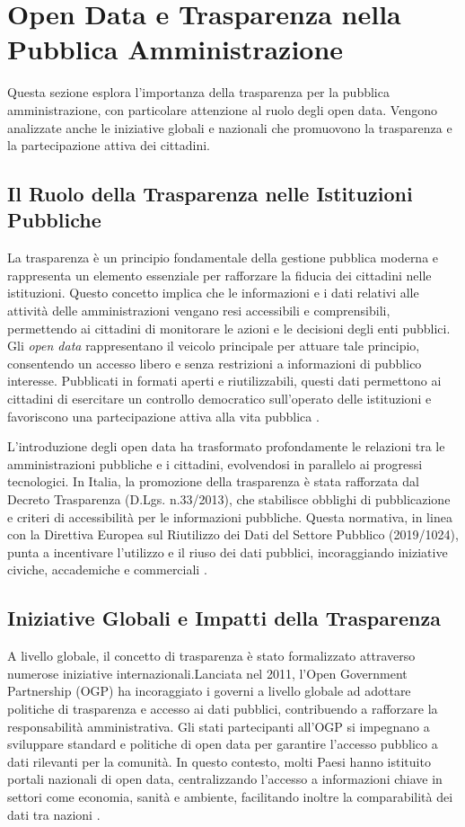 \section{Open Data e Trasparenza nella Pubblica Amministrazione}
Questa sezione esplora l'importanza della trasparenza per la pubblica amministrazione, con particolare attenzione al ruolo degli open data. Vengono analizzate anche le iniziative globali e nazionali che promuovono la trasparenza e la partecipazione attiva dei cittadini.

\subsection{Il Ruolo della Trasparenza nelle Istituzioni Pubbliche}

La trasparenza è un principio fondamentale della gestione pubblica moderna e rappresenta un elemento essenziale per rafforzare la fiducia dei cittadini nelle istituzioni. Questo concetto implica che le informazioni e i dati relativi alle attività delle amministrazioni vengano resi accessibili e comprensibili, permettendo ai cittadini di monitorare le azioni e le decisioni degli enti pubblici. Gli \textit{open data} rappresentano il veicolo principale per attuare tale principio, consentendo un accesso libero e senza restrizioni a informazioni di pubblico interesse. Pubblicati in formati aperti e riutilizzabili, questi dati permettono ai cittadini di esercitare un controllo democratico sull'operato delle istituzioni e favoriscono una partecipazione attiva alla vita pubblica \cite{Davies2019}.

L’introduzione degli open data ha trasformato profondamente le relazioni tra le amministrazioni pubbliche e i cittadini, evolvendosi in parallelo ai progressi tecnologici. In Italia, la promozione della trasparenza è stata rafforzata dal Decreto Trasparenza (D.Lgs. n.33/2013), che stabilisce obblighi di pubblicazione e criteri di accessibilità per le informazioni pubbliche. Questa normativa, in linea con la Direttiva Europea sul Riutilizzo dei Dati del Settore Pubblico (2019/1024), punta a incentivare l’utilizzo e il riuso dei dati pubblici, incoraggiando iniziative civiche, accademiche e commerciali \cite{FOIAItalia}.

\subsection{Iniziative Globali e Impatti della Trasparenza}

A livello globale, il concetto di trasparenza è stato formalizzato attraverso numerose iniziative internazionali.Lanciata nel 2011, l’Open Government Partnership (OGP) ha incoraggiato i governi a livello globale ad adottare politiche di trasparenza e accesso ai dati pubblici, contribuendo a rafforzare la responsabilità amministrativa. Gli stati partecipanti all’OGP si impegnano a sviluppare standard e politiche di open data per garantire l’accesso pubblico a dati rilevanti per la comunità. In questo contesto, molti Paesi hanno istituito portali nazionali di open data, centralizzando l’accesso a informazioni chiave in settori come economia, sanità e ambiente, facilitando inoltre la comparabilità dei dati tra nazioni \cite{OpenDataCharter}.

